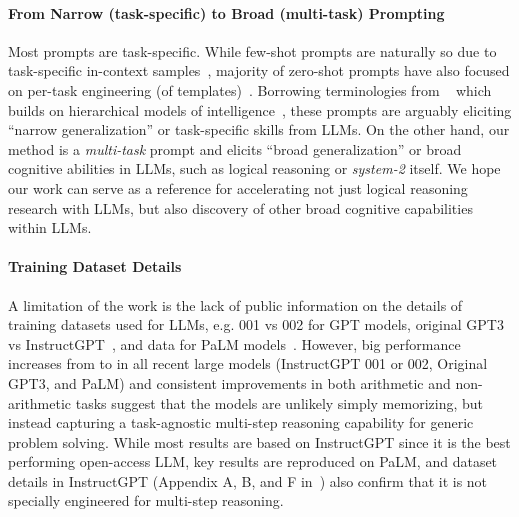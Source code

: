 \paragraph{From Narrow (task-specific) to Broad (multi-task) Prompting}
Most prompts are task-specific. While few-shot prompts are naturally so due to task-specific in-context samples~\citep{brown2020language,cot_wei}, majority of zero-shot prompts have also focused on per-task engineering (of templates)~\citep{liu2021pre,prompt1}. Borrowing terminologies from ~\citet{chollet2019measure} which builds on hierarchical models of intelligence~\citep{mcgrew2005cattell,johnson2005structure}, these prompts are arguably eliciting ``narrow generalization'' or task-specific skills from LLMs. On the other hand, our method is a \textit{multi-task} prompt and elicits ``broad generalization'' or broad cognitive abilities in LLMs, such as logical reasoning or \textit{system-2} itself. We hope our work can serve as a reference for accelerating not just logical reasoning research with LLMs, but also discovery of other broad cognitive capabilities within LLMs. 


\paragraph{Training Dataset Details}
\label{appx:limitation_dataset}
A limitation of the work is the lack of public information on the details of training datasets used for LLMs, e.g. 001 vs 002 for GPT models, original GPT3 vs InstructGPT~\citep{instructgpt}, and data for PaLM models~\citep{palm}. However, big performance increases from \theirsz to \ours in all recent large models (InstructGPT 001 or 002, Original GPT3, and PaLM) and consistent improvements in both arithmetic and non-arithmetic tasks suggest that the models are unlikely simply memorizing, but instead capturing a task-agnostic multi-step reasoning capability for generic problem solving. While most results are based on InstructGPT since it is the best performing open-access LLM, key results are reproduced on PaLM, and dataset details in InstructGPT (Appendix A, B, and F in~\citet{instructgpt}) also confirm that it is not specially engineered for multi-step reasoning. 

